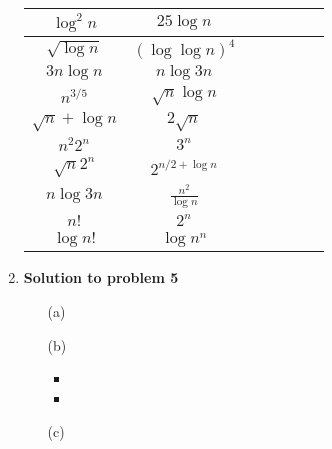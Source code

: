 \documentclass[11pt]{article}
\newcommand{\problemitem}[1]{
  \bigskip
  \item {\bf Solution to problem #1}
  \medskip
}
\begin{document}
\begin{enumerate}
\begin{table}[tbh]
\begin{tabular}{|c|c|c|c|c|c|c|}
%
%

  $\log^2 n$            &  $25 \log n$
      &           &           &           &           &           \\ \hline

  $\sqrt{\log n}$       & $(\log \log n)^4$
      &           &           &           &           &           \\ \hline

  $3n \log n$           &  $n \log 3n$
      &           &           &           &           &           \\ \hline

  $n^{3/5}$             & $\sqrt{n} \log n$
      &           &           &           &           &           \\ \hline

  $\sqrt{n} + \log n$   & $2 \sqrt{n}$
      &           &           &           &           &           \\ \hline

  $n^2 2^n$             & $3^n$
      &           &           &           &           &           \\ \hline

  $\sqrt{n} 2^n$        & $2^{n/2 + \log n}$
      &           &           &           &           &           \\ \hline

  $n \log 3n$           & $\frac{n^2}{\log n}$
      &           &           &           &           &           \\ \hline

  $n!$                  & $2^n$
      &           &           &           &           &           \\ \hline

  $\log n!$             & $\log n^n$
      &           &           &           &           &           \\ \hline

  \end{tabular}
\end{table}

\problemitem{5}
\begin{enumerate}
  \item[(a)]

  \item[(b)]
    \begin{itemize}
      \item

      \item

    \end{itemize}
  \item[(c)]

\end{enumerate}

\end{enumerate}
\end{document}
